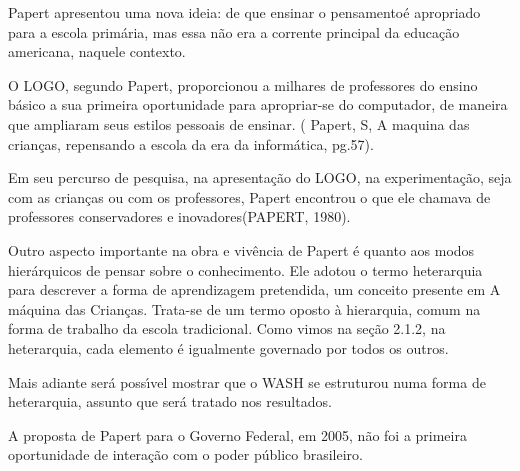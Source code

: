 \documentclass[
12pt,		%
openright,	%
twoside,  %
a4paper,			%
chapter=TITLE,		%
english,			%
french,				%
spanish,			%
brazil				%
]{USPSC-classe/USPSC}
\begin{document}
Papert apresentou uma nova ideia: de que \textquotedbl ensinar o pensamento\textquotedbl   \'e apropriado para a escola prim\'aria, mas essa n\~ao era a corrente principal da educa\c{c}\~ao americana, naquele contexto.









O LOGO, segundo Papert, proporcionou a milhares de professores do ensino b\'asico a sua primeira oportunidade para apropriar-se do computador, de maneira que ampliaram seus estilos pessoais de ensinar. ( Papert, S, \textquotedbl A maquina das crian\c{c}as, repensando a escola da era da inform\'atica\textquotedbl , pg.57).









Em seu percurso de pesquisa, na apresenta\c{c}\~ao do LOGO, na experimenta\c{c}\~ao, seja com as crian\c{c}as ou com os professores, Papert encontrou o que ele chamava de \textquotedbl professores conservadores e  inovadores\textquotedbl  (PAPERT, 1980).









Outro aspecto importante na obra e viv\^encia de Papert \'e quanto aos modos hier\'arquicos de pensar sobre o conhecimento. Ele adotou o termo  \textquotedbl  heterarquia \textquotedbl  para descrever a forma de aprendizagem pretendida, um conceito presente em  \textquotedbl A m\'aquina das Crian\c{c}as\textquotedbl . Trata-se de  um termo oposto \`a hierarquia, comum na forma de trabalho da escola tradicional. Como vimos na se\c{c}\~ao 2.1.2, na heterarquia, cada elemento \'e igualmente governado por todos os outros.









Mais adiante ser\'a poss\'{\i}vel mostrar que o WASH se estruturou numa forma de heterarquia, assunto que ser\'a tratado nos resultados.









A proposta de Papert para o Governo Federal, em 2005, n\~ao foi a primeira oportunidade de intera\c{c}\~ao com o poder p\'ublico brasileiro.
\end{document}

